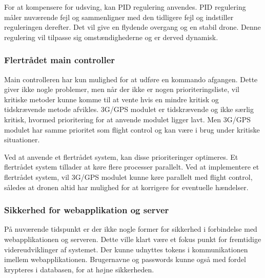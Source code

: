 For at kompensere for udsving, kan PID regulering anvendes. PID regulering måler nuværende fejl og sammenligner med den tidligere fejl og indstiller reguleringen derefter. Det vil give en flydende overgang og en stabil drone. Denne regulering vil tilpasse sig omstændighederne og er derved dynamisk.

\subsubsection*{Flertrådet main controller}
Main controlleren har kun mulighed for at udføre en kommando afgangen. Dette giver ikke nogle problemer, men når der ikke er nogen prioriteringsliste, vil kritiske metoder kunne komme til at vente hvis en mindre kritisk og tidskrævende metode afvikles. 
3G/GPS modulet er tidskrævende og ikke særlig kritisk, hvormed prioritering for at anvende modulet ligger lavt. Men 3G/GPS modulet har samme prioritet som flight control og kan være i brug under kritiske situationer. 

Ved at anvende et flertrådet system, kan disse prioriteringer optimeres. Et flertrådet system tillader at køre flere processer parallelt. Ved at implementere et flertrådet system, vil 3G/GPS modulet kunne køre parallelt med flight control, således at dronen altid har mulighed for at korrigere for eventuelle hændelser. 

\subsubsection*{Sikkerhed for webapplikation og server}
På nuværende tidspunkt er der ikke nogle former for sikkerhed i forbindelse med webapplikationen og serveren. Dette ville klart være et fokus punkt for fremtidige videreudviklinger af systemet. Der kunne udnyttes tokens i kommunikationen imellem webapplikationen. 
Brugernavne og passwords kunne også med fordel krypteres i databasen, for at højne sikkerheden.
